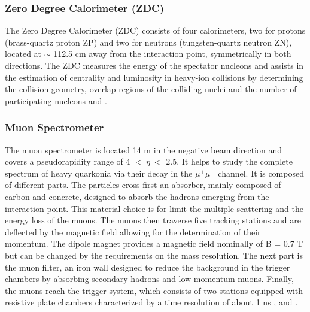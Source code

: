 \documentclass[12pt,a4paper]{book}
\begin{document}
	\subsubsection{Zero Degree Calorimeter (ZDC)}
	The Zero Degree Calorimeter (ZDC) consists of four calorimeters, two for protons (brass-quartz proton ZP) and two for neutrons (tungsten-quartz neutron ZN), located at $\sim$ 112.5 cm away from the interaction point, symmetrically in both directions. The ZDC measures the energy of the spectator nucleons and assists in the estimation of centrality and luminosity in heavy-ion collisions by determining the collision geometry, overlap regions of the colliding nuclei and the number of participating nucleons \cite{Padhan:2924203} and \cite{amsdottorato9036}.
	
	\subsubsection{Muon Spectrometer}
	The muon spectrometer is located 14 m in the negative beam direction and covers a pseudorapidity range of 4 $<\ \eta\ <$ 2.5. It helps to study the complete spectrum of heavy quarkonia via their decay in the $\mu^+ \mu^-$ channel. It is composed of different parts. The particles cross first an absorber, mainly composed of carbon and concrete, designed to absorb the hadrons emerging from the interaction point. This material choice is for limit the multiple scattering and the energy loss of the muons. The muons then traverse five tracking stations and are deflected by the magnetic field allowing for the determination of their momentum. The dipole magnet provides a magnetic field nominally of B = 0.7 T but can be changed by the requirements on the mass resolution. The next part is the muon filter, an iron wall designed to reduce the background in the trigger chambers by absorbing secondary hadrons and low momentum muons. Finally, the muons reach the trigger system, which consists of two stations equipped with resistive plate chambers characterized by a time resolution of about 1 ns
	\cite{Padhan:2924203}, \cite{Alicemuonspectometer} and \cite{Herrmann:2920632}.
	
\end{document}
